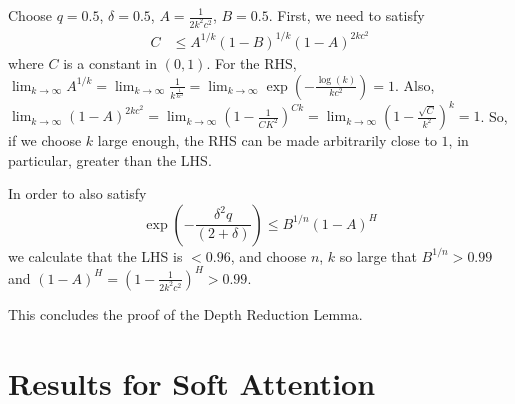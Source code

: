 \documentclass[11pt,a4paper]{article}
\begin{document}
Choose $q=0.5$, $\delta=0.5$, $A=\frac{1}{2k^2c^2}$, $B=0.5$.
First, we need to satisfy
\begin{align}
    C &\leq A^{1/k}(1-B)^{1/k}(1-A)^{2kc^2} 
\end{align}
where $C$ is a constant in $(0,1)$.
For the RHS, 
$\lim_{k\rightarrow \infty} A^{1/k} = \lim_{k\rightarrow \infty} \frac{1}{k^\frac{1}{kc^2}} = \lim_{k\rightarrow \infty} \exp(-\frac{\log(k)}{kc^2}) = 1$.
Also, $\lim_{k\rightarrow \infty} (1-A)^{2kc^2} = \lim_{k\rightarrow \infty} (1-\frac{1}{CK^2})^{Ck} = \lim_{k\rightarrow \infty} (1-\frac{\sqrt{C}}{k^2})^{k} = 1$. So, if we choose $k$ large enough, the RHS can be made arbitrarily close to $1$, in particular, greater than the LHS.

In order to also satisfy
\begin{equation}
\exp\left(-\frac{\delta^2q}{(2+\delta)}\right)  \leq B^{1/n} (1-A)^H
\end{equation}
we calculate that the LHS is $<0.96$, and choose $n$, $k$ so large that $B^{1/n} > 0.99$ and $(1-A)^H = (1-\frac{1}{2k^2c^2})^H > 0.99$.

This concludes the proof of the Depth Reduction Lemma.





\section{Results for Soft Attention}


\end{document}
